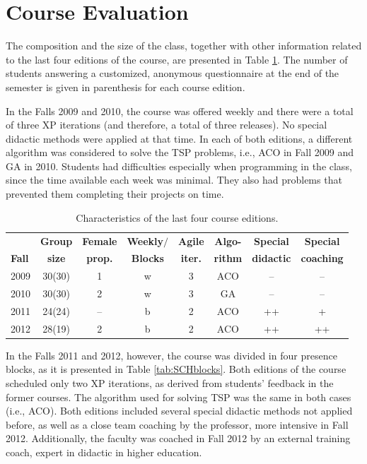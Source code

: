 \documentclass[conference]{IEEEtran}
\begin{document}
\section{Course Evaluation}
\label{sec:courseeval}

The composition and the size of the class, together with other information related to the last four editions of the course, are presented in Table \ref{tab:groupsize}. The number of students answering a customized, anonymous questionnaire at the end of the semester is given in parenthesis for each course edition. 

In the Falls 2009 and 2010, the course was offered weekly and there were a total of three XP iterations (and therefore, a total of three releases). No special didactic methods were applied at that time. In each of both editions, a different algorithm was considered to solve the TSP problems, i.e., ACO in Fall 2009 and GA in 2010. Students had difficulties especially when programming in the class, since the time available each week was minimal. They also had problems that prevented them completing their projects on time.

\begin{table}[!t]
  \renewcommand{\arraystretch}{1.3}
  \setlength{\tabcolsep}{0.6em}
  \caption{Characteristics of the last four course editions.}
  \label{tab:groupsize}
  \centering
  \begin{tabular}{|l|c|c|c|c|c|c|c|}
    \hline
    & \bfseries Group & \bfseries Female & \bfseries Weekly$/$ & \bfseries Agile & \bfseries Algo- & \bfseries Special & \bfseries Special\\
    \bfseries Fall & \bfseries size & \bfseries prop. & \bfseries Blocks & \bfseries iter. & \bfseries rithm & \bfseries didactic & \bfseries coaching\\
    \hline \hline
    2009 & 30(30) & 1  & w & 3 & ACO & -- & -- \\
    2010 & 30(30) & 2  & w & 3 & GA  & -- & -- \\
    2011 & 24(24) & -- & b & 2 & ACO & ++ & + \\
    2012 & 28(19) & 2  & b & 2 & ACO & ++ & ++ \\
    \hline
  \end{tabular}
\end{table}

In the Falls 2011 and 2012, however, the course was divided in four presence blocks, as it is presented in Table \ref{tab:SCHblocks}. Both editions of the course scheduled only two XP iterations, as derived from students' feedback in the former courses. The algorithm used for solving TSP was the same in both cases (i.e., ACO). Both editions included several special didactic methods not applied before, as well as a close team coaching by the professor, more intensive in Fall 2012. Additionally, the faculty was coached in Fall 2012 by an external training coach,  expert in didactic in higher education.
\end{document}

